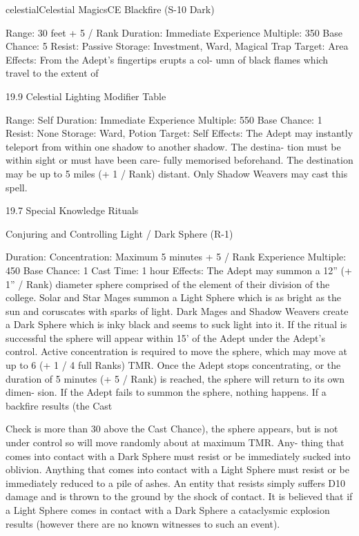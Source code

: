 \begin{College}[1.3]{celestial}{Celestial Magics}{CE}
Blackfire (S-10 Dark) 

Range: 30 feet + 5 / Rank 
Duration: Immediate 
Experience Multiple: 350 
Base Chance: 5%
Resist: Passive 
Storage: Investment, Ward, Magical Trap 
Target: Area 
Effects:  From  the  Adept’s  fingertips  erupts  a  col-
umn  of  black  flames  which  travel  to  the  extent  of 

19.9 Celestial Lighting Modifier Table 

Range: Self 
Duration: Immediate 
Experience Multiple: 550 
Base Chance: 1%
Resist: None 
Storage: Ward, Potion 
Target: Self 
Effects:  The  Adept  may  instantly  teleport  from 
within one shadow to another shadow. The destina-
tion  must  be  within  sight  or  must  have  been  care-
fully  memorised  beforehand.  The  destination  may 
be up to 5 miles (+ 1 / Rank) distant. Only Shadow 
Weavers may cast this spell. 

19.7 Special Knowledge Rituals 

Conjuring and Controlling Light / Dark 
Sphere (R-1) 

Duration: Concentration: Maximum 5 minutes + 5 
/ Rank 
Experience Multiple: 450 
Base Chance: 1%
Cast Time: 1 hour 
Effects:  The  Adept  may  summon  a  12”  (+  1”  / 
Rank) diameter sphere comprised of the element of 
their division of the college. Solar and Star Mages 
summon  a  Light  Sphere  which  is  as  bright  as  the 
sun  and  coruscates  with  sparks  of  light.  Dark 
Mages and Shadow Weavers create a Dark Sphere 
which is inky black and seems to suck light into it. 
If  the  ritual  is  successful  the  sphere  will  appear 
within 15’ of the Adept under the Adept’s control. 
Active  concentration  is  required  to  move  the 
sphere,  which  may  move  at  up  to  6  (+  1  /  4  full 
Ranks) TMR. Once the Adept stops concentrating, 
or  the  duration  of  5  minutes  (+  5  /  Rank)  is 
reached,  the  sphere  will  return  to  its  own  dimen-
sion.  If  the  Adept  fails  to  summon  the  sphere, 
nothing  happens.  If  a  backfire  results  (the  Cast 

Check is more than 30 above the Cast Chance), the 
sphere  appears,  but  is  not  under  control  so  will 
move  randomly  about  at  maximum  TMR.  Any-
thing  that  comes  into  contact  with  a  Dark  Sphere 
must resist or be immediately sucked into oblivion. 
Anything  that  comes  into  contact  with  a  Light 
Sphere must resist or be immediately reduced to a 
pile  of  ashes.  An  entity  that  resists  simply  suffers 
D10  damage  and  is  thrown  to  the  ground  by  the 
shock  of  contact.  It  is  believed  that  if  a  Light 
Sphere  comes  in  contact  with  a  Dark  Sphere  a 
cataclysmic  explosion  results  (however  there  are 
no known witnesses to such an event). 


\end{College}
